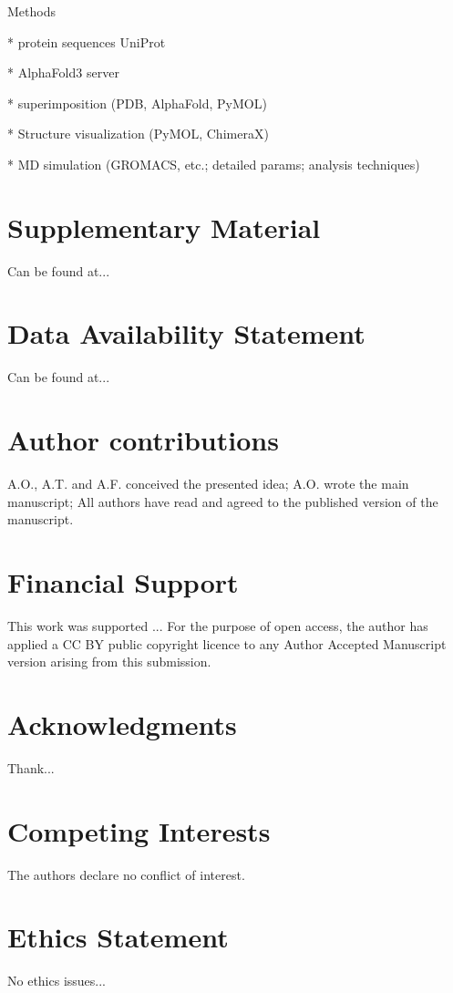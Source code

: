 \documentclass[fleqn,10pt,lineno]{manuscript}
\begin{document}
Methods

* protein sequences UniProt

* AlphaFold3 server

* superimposition (PDB, AlphaFold, PyMOL)

* Structure visualization (PyMOL, ChimeraX)

* MD simulation (GROMACS, etc.; detailed params; analysis techniques)


\section*{Supplementary Material}

Can be found at...


\section*{Data Availability Statement} 

Can be found at...


\section*{Author contributions}

A.O., A.T. and A.F. conceived the presented idea; A.O. wrote the main manuscript; All authors have read and agreed to the published version of the manuscript.


\section*{Financial Support}

This work was supported ... For the purpose of open access, the author has applied a CC BY public copyright licence to any Author Accepted Manuscript version arising from this submission.


\section*{Acknowledgments}

Thank...


\section*{Competing Interests}

The authors declare no conflict of interest.


\section*{Ethics Statement}

No ethics issues...



\end{document}
